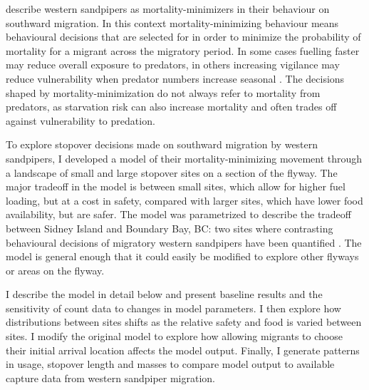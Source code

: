\citet{Hope2011} describe western sandpipers as mortality-minimizers in their behaviour on southward migration. In this context mortality-minimizing behaviour means behavioural decisions that are selected for in order to minimize the probability of mortality for a migrant across the migratory period. In some cases fuelling faster may reduce overall exposure to predators, in others increasing vigilance may reduce vulnerability when predator numbers increase seasonal \citep{Hope2014}. The decisions shaped by mortality-minimization do not always refer to mortality from predators, as starvation risk can also increase mortality and often trades off against vulnerability to predation.  


To explore stopover decisions made on southward migration by western sandpipers, I developed a model of their mortality-minimizing movement through a landscape of small and large stopover sites on a section of the flyway. The major tradeoff in the model is between small sites, which allow for higher fuel loading, but at a cost in safety, compared with larger sites, which have lower food availability, but are safer. The model was parametrized to describe the tradeoff between Sidney Island and Boundary Bay, BC: two sites where contrasting behavioural decisions of migratory western sandpipers have been quantified \citep[e.g. ][]{Ydenberg2002,ydenberg_western_2004}. The model is general enough that it could easily be modified to explore other flyways or areas on the flyway. 

I describe the model in detail below and present baseline results and the sensitivity  of count data to changes in model parameters. I then explore how distributions between sites shifts as the relative safety and food is varied between sites. I modify the original model to explore how allowing migrants to choose their initial arrival location affects the model output. Finally, I generate patterns in usage, stopover length and masses to compare model output to available capture data from western sandpiper migration. 